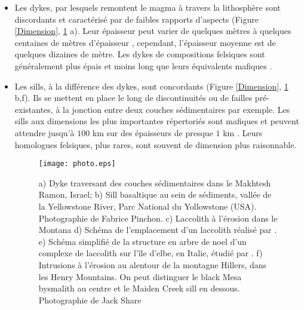 \begin{itemize}
\item  Les  dykes,  par  lesquels  remontent le  magma  à  travers  la
  lithosphère sont discordants et  caractérisé par de faibles rapports
  d'aspects (Figure \ref{Dimension}, \ref{picture} a).  Leur épaisseur
  peut  varier  de quelques  mètres  à  quelques centaines  de  mètres
  d'épaisseur      \citep{Walker:1989jq,Rubin:1995upa},     cependant,
  l'épaisseur moyenne est de quelques  dizaines de mètre. Les dykes de
  compositions felsiques  sont généralement  plus épais et  moins long
  que leurs équivalents mafiques \citep{Rubin:1995upa}.

\item Les sills,  à la différence des dykes,  sont concordants (Figure
  \ref{Dimension},  \ref{picture} b,f).   Ils se  mettent en  place le
  long de discontinuités  ou de failles pré-existantes,  à la jonction
  entre  deux  couches  sédimentaires  par  exemple.   Les  sills  aux
  dimensions les plus importantes répertoriés sont mafiques et peuvent
  attendre  jusqu'à $100$  km sur  des  épaisseurs de  presque $1$  km
  \citep{Cruden:tg}.   Leurs homologues  felsiques,  plus rares,  sont
  souvent de dimension plus raisonnable.

  \begin{figure}[h!]
    \begin{center}
      \graphicspath{ {/Users/thorey/Documents/These/Manuscript/Figure/Chapter1/} }
      \texttt{[image: photo.eps]}
      \caption{a) Dyke  traversant des  couches sédimentaires  dans le
        Makhtesh  Ramon,  Israel;  b)   Sill  basaltique  au  sein  de
        sédiments, vallée  de la  Yellowstone River, Parc  National du
        Yollowstone  (USA).   Photographie  de  Fabrice  Pinchon.   c)
        Laccolith   à  l'érosion   dans  le   Montana  d)   Schéma  de
        l'emplacement       d'un      laccolith       réalisé      par
        \citet{Gilbert:1877uk}. e) Schéma simplifié de la structure en
        arbre de noel d'un complexe  de laccolith sur l'île d'elbe, en
        Italie,  étudié par  \citet{Rocchi:2010dn}.   f) Intrusions  à
        l'érosion au alentour  de la montagne Hillers,  dans les Henry
        Mountains.   On peut  distinguer  le black  Mesa bysmalith  au
        centre et  le Maiden Creek  sill en dessous.   Photographie de
        Jack Share}
      \label{picture}
    \end{center}
  \end{figure}


\end{itemize}
